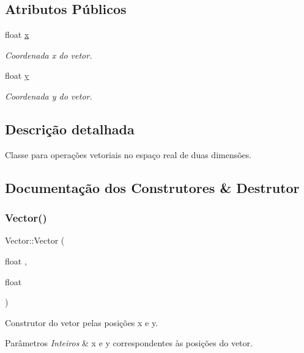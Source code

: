 \subsection*{Atributos Públicos}
\begin{DoxyCompactItemize}
\item 
\mbox{\label{classVector_aca49165049a1e21ae47afcfc078819ed}} 
float \mbox{\hyperlink{classVector_aca49165049a1e21ae47afcfc078819ed}{x}}
\begin{DoxyCompactList}\small\item\em Coordenada x do vetor. \end{DoxyCompactList}\item 
\mbox{\label{classVector_a81be9102fca6d9beea3efef522c4c09d}} 
float \mbox{\hyperlink{classVector_a81be9102fca6d9beea3efef522c4c09d}{y}}
\begin{DoxyCompactList}\small\item\em Coordenada y do vetor. \end{DoxyCompactList}\end{DoxyCompactItemize}


\subsection{Descrição detalhada}
Classe para operações vetoriais no espaço real de duas dimensões. 

\subsection{Documentação dos Construtores \& Destrutor}
\mbox{\label{classVector_a1d3e69fe5741740aa40e7b5fd2cbf0e8}} 
\subsubsection{\texorpdfstring{Vector()}{Vector()}\hspace{0.1cm}{\footnotesize\ttfamily [1/2]}}
{\footnotesize\ttfamily Vector\+::\+Vector (\begin{DoxyParamCaption}\item[{float}]{,  }\item[{float}]{ }\end{DoxyParamCaption})}

Construtor do vetor pelas posições x e y. 
\begin{DoxyParams}{Parâmetros}
{\em Inteiros} & x e y correspondentes às posições do vetor. \\
\hline
\end{DoxyParams}
\mbox{\label{classVector_abdb4dca6245e33a8661d1ab02bb50016}} 
